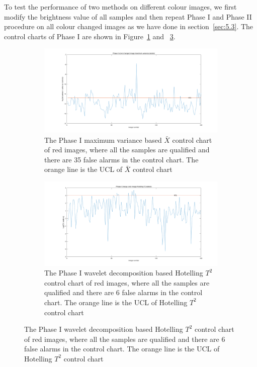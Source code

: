 To test the performance of two methods on different colour images, we first modify the brightness value of all samples and then repeat Phase I and Phase II procedure on all colour changed images as we have done in section~\ref{sec:5.3}. The control charts of Phase I are shown in Figure~\ref{fig:phasI_methodI_color} and ~\ref{fig:phasI_methodII_color}.

\begin{figure}
    \centering
    \begin{subfigure}{\textwidth}
         \centering
         \includegraphics[width=\textwidth]{images/phaseI_color_max.png}
         \caption{The Phase I maximum variance based $\bar{X}$ control chart of red images, where all the samples are qualified and there are 35 false alarms in the control chart. The orange line is the UCL of $\bar{X}$ control chart}
        \label{fig:phasI_methodI_color}
    \end{subfigure}
     
    \begin{subfigure}{\textwidth}
         \centering
         \includegraphics[width=\textwidth]{images/phaseI_color_t2.png}
         \caption{The Phase I wavelet decomposition based Hotelling $T^{2}$ control chart of red images, where all the samples are qualified and there are 6 false alarms in the control chart. The orange line is the UCL of Hotelling $T^{2}$ control chart}
        \label{fig:phasI_methodII_color}
    \end{subfigure}
\end{figure}

